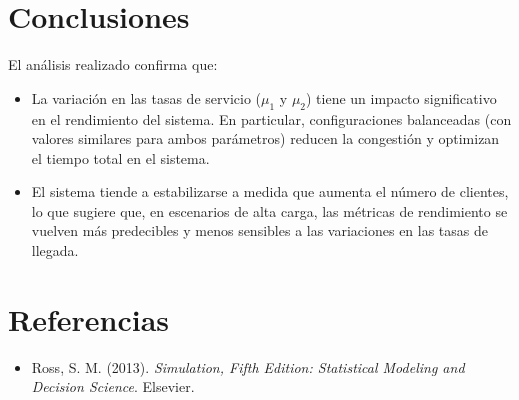 \documentclass[12pt]{article}
\begin{document}
\section{Conclusiones}
El análisis realizado confirma que:
\begin{itemize}
    \item La variación en las tasas de servicio (\(\mu_1\) y \(\mu_2\)) tiene un impacto significativo en el rendimiento del sistema. En particular, configuraciones balanceadas (con valores similares para ambos parámetros) reducen la congestión y optimizan el tiempo total en el sistema.
    \item El sistema tiende a estabilizarse a medida que aumenta el número de clientes, lo que sugiere que, en escenarios de alta carga, las métricas de rendimiento se vuelven más predecibles y menos sensibles a las variaciones en las tasas de llegada.
\end{itemize}

\section*{Referencias}
\begin{itemize}
    \item Ross, S. M. (2013). \textit{Simulation, Fifth Edition: Statistical Modeling and Decision Science}. Elsevier.
\end{itemize}
\end{document}
